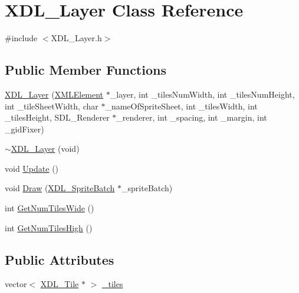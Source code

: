 \hypertarget{class_x_d_l___layer}{\section{X\-D\-L\-\_\-\-Layer Class Reference}
\label{class_x_d_l___layer}
}


{\ttfamily \#include $<$X\-D\-L\-\_\-\-Layer.\-h$>$}

\subsection*{Public Member Functions}
\begin{DoxyCompactItemize}
\item 
\hyperlink{class_x_d_l___layer_a927d3a9c6890e17bb59ab45dee6dbb70}{X\-D\-L\-\_\-\-Layer} (\hyperlink{classtinyxml2_1_1_x_m_l_element}{X\-M\-L\-Element} $\ast$\-\_\-layer, int \-\_\-tiles\-Num\-Width, int \-\_\-tiles\-Num\-Height, int \-\_\-tile\-Sheet\-Width, char $\ast$\-\_\-name\-Of\-Sprite\-Sheet, int \-\_\-tiles\-Width, int \-\_\-tiles\-Height, S\-D\-L\-\_\-\-Renderer $\ast$\-\_\-renderer, int \-\_\-spacing, int \-\_\-margin, int \-\_\-gid\-Fixer)
\item 
\hyperlink{class_x_d_l___layer_adf631a3db5e4724b4223ddc9b5c0d661}{$\sim$\-X\-D\-L\-\_\-\-Layer} (void)
\item 
void \hyperlink{class_x_d_l___layer_af72c722f3272b6b7c1880c73747608ff}{Update} ()
\item 
void \hyperlink{class_x_d_l___layer_ace05bd79e664714d3a744a3af2ef88d9}{Draw} (\hyperlink{class_x_d_l___sprite_batch}{X\-D\-L\-\_\-\-Sprite\-Batch} $\ast$\-\_\-sprite\-Batch)
\item 
int \hyperlink{class_x_d_l___layer_a05d453ae2900d1cdfab2f7357d78d769}{Get\-Num\-Tiles\-Wide} ()
\item 
int \hyperlink{class_x_d_l___layer_a65bab3b436d6abdf8758f5ab9f2fc6b2}{Get\-Num\-Tiles\-High} ()
\end{DoxyCompactItemize}
\subsection*{Public Attributes}
\begin{DoxyCompactItemize}
\item 
vector$<$ \hyperlink{class_x_d_l___tile}{X\-D\-L\-\_\-\-Tile} $\ast$ $>$ \hyperlink{class_x_d_l___layer_a7c56eae3df1548d3ab7a63128153c3ed}{\-\_\-tiles}
\end{DoxyCompactItemize}


